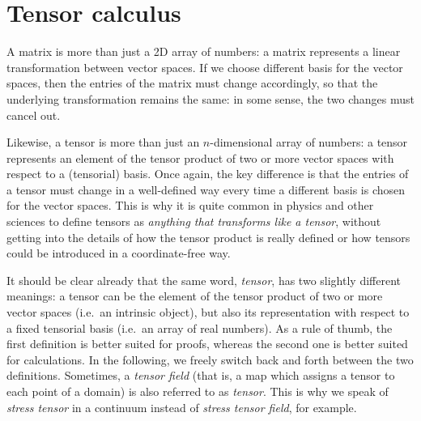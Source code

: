 \chapter{Tensor calculus} \label{ch:appendix-tensors}

A matrix is more than just a 2D array of numbers: a matrix represents
a linear transformation between vector spaces.
If we choose different basis for the vector spaces, then the entries of the matrix
must change accordingly, so that the underlying transformation remains
the same: in some sense, the two changes must cancel out.

Likewise, a tensor is more than just an $n$-dimensional array of numbers:
a tensor represents an element of the tensor product of two or more
vector spaces with respect to a (tensorial) basis.
Once again, the key difference is that the entries of a tensor must
change in a well-defined way every time a different basis is chosen
for the vector spaces. This is why it is quite common in physics and other sciences
to define tensors as \emph{anything that transforms like a tensor},
without getting into the details of how the tensor product is really defined
or how tensors could be introduced in a coordinate-free way.

It should be clear already that the same word, \emph{tensor},
has two slightly different meanings: a tensor can be the element
of the tensor product of two or more vector spaces (i.e.\ an intrinsic object),
but also its representation with respect to a fixed tensorial basis
(i.e.\ an array of real numbers).
As a rule of thumb, the first definition is better suited for proofs,
whereas the second one is better suited for calculations.
In the following, we freely switch back and forth between the two definitions.
Sometimes, a \emph{tensor field} (that is, a map which assigns
a tensor to each point of a domain) is also referred to as \emph{tensor}.
This is why we speak of \emph{stress tensor} in a continuum instead of
\emph{stress tensor field}, for example.


